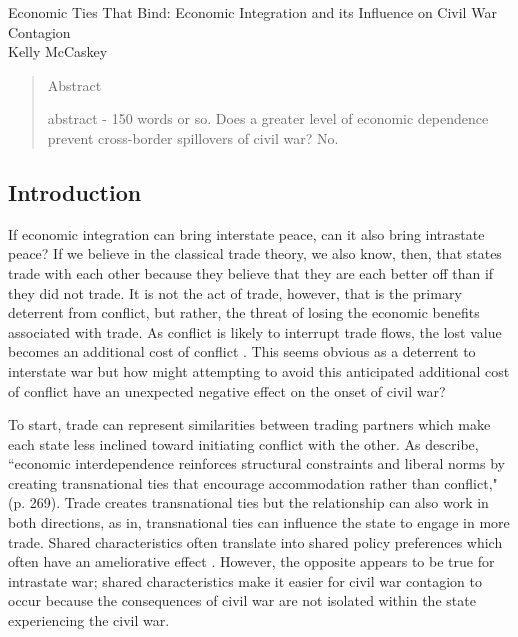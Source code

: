 \documentclass[12pt,letterpaper]{article}
\begin{document}
\begin{center}
{\LARGE Economic Ties That Bind: Economic Integration and its Influence on Civil War Contagion}\\\vspace{2mm}
\vspace{10mm}
Kelly McCaskey
\end{center}

\newpage
\begin{quote}
\begin{center} Abstract\end{center}
abstract - 150 words or so. Does a greater level of economic dependence prevent cross-border spillovers of civil war? No.
\end{quote}


\newpage
\doublespace
\subsection*{Introduction}
If economic integration can bring interstate peace, can it also bring intrastate peace? If we believe in the classical trade theory, we also know, then, that states trade with each other because they believe that they are each better off than if they did not trade. It is not the act of trade, however, that is the primary deterrent from conflict, but rather, the threat of losing the economic benefits associated with trade. As conflict is likely to interrupt trade flows, the lost value becomes an additional cost of conflict \citep{DorussenWard2010}. This seems obvious as a deterrent to interstate war but how might attempting to avoid this anticipated additional cost of conflict have an unexpected negative effect on the onset of civil war?

To start, trade can represent similarities between trading partners which make each state less inclined toward initiating conflict with the other. As \citet{OnealRussett1997} describe, ``economic interdependence reinforces structural constraints and liberal norms by creating transnational ties that encourage accommodation rather than conflict," (p. 269). Trade creates transnational ties but the relationship can also work in both directions, as in, transnational ties can influence the state to engage in more trade. Shared characteristics often translate into shared policy preferences which often have an ameliorative effect \citep{Gartzke2007}. However, the opposite appears to be true for intrastate war; shared characteristics make it easier for civil war contagion to occur because the consequences of civil war are not isolated within the state experiencing the civil war. 
\end{document}
